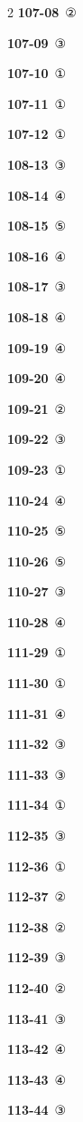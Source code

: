 \documentclass[10pt,a4paper]{article}
\begin{document}
\begin{multicols}{2}
\noindent\textbf{107-08}\ ②\par
\noindent\textbf{107-09}\ ③\par
\noindent\textbf{107-10}\ ①\par
\noindent\textbf{107-11}\ ①\par
\noindent\textbf{107-12}\ ①\par
\noindent\textbf{108-13}\ ③\par
\noindent\textbf{108-14}\ ④\par
\noindent\textbf{108-15}\ ⑤\par
\noindent\textbf{108-16}\ ④\par
\noindent\textbf{108-17}\ ③\par
\noindent\textbf{108-18}\ ④\par
\noindent\textbf{109-19}\ ④\par
\noindent\textbf{109-20}\ ④\par
\noindent\textbf{109-21}\ ②\par
\noindent\textbf{109-22}\ ③\par
\noindent\textbf{109-23}\ ①\par
\noindent\textbf{110-24}\ ④\par
\noindent\textbf{110-25}\ ⑤\par
\noindent\textbf{110-26}\ ⑤\par
\noindent\textbf{110-27}\ ③\par
\noindent\textbf{110-28}\ ④\par
\noindent\textbf{111-29}\ ①\par
\noindent\textbf{111-30}\ ①\par
\noindent\textbf{111-31}\ ④\par
\noindent\textbf{111-32}\ ③\par
\noindent\textbf{111-33}\ ③\par
\noindent\textbf{111-34}\ ①\par
\noindent\textbf{112-35}\ ③\par
\noindent\textbf{112-36}\ ①\par
\noindent\textbf{112-37}\ ②\par
\noindent\textbf{112-38}\ ②\par
\noindent\textbf{112-39}\ ③\par
\noindent\textbf{112-40}\ ②\par
\noindent\textbf{113-41}\ ③\par
\noindent\textbf{113-42}\ ④\par
\noindent\textbf{113-43}\ ④\par
\noindent\textbf{113-44}\ ③\par

\end{multicols}
\end{document}
